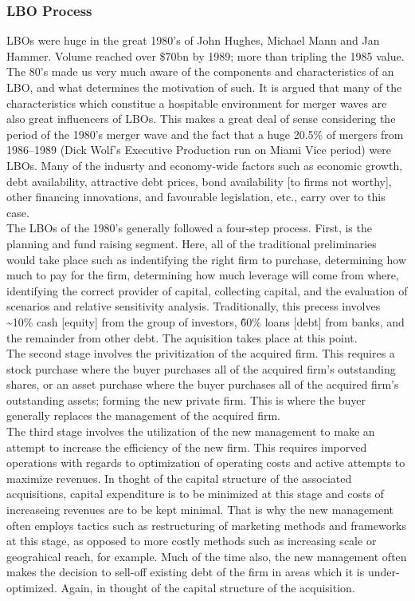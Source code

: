 \documentclass[11pt, english]{article}
\begin{document}
		\subsubsection*{LBO Process}

	LBOs were huge in the great 1980's of John Hughes, Michael Mann and Jan Hammer. Volume reached over \$70bn by 1989; more than tripling the 1985 value. The 80's made us very much aware of the components and characteristics of an LBO, and what determines the motivation of such. It is argued that many of the characteristics which constitue a hospitable environment for merger waves are also great influencers of LBOs. This makes a great deal of sense considering the period of the 1980's merger wave and the fact that a huge 20.5\% of mergers from 1986--1989 (Dick Wolf's Executive Production run on Miami Vice period) were LBOs. Many of the indusrty and economy-wide factors such as economic growth, debt availability, attractive debt prices, bond availability [to firms not worthy], other financing innovations, and favourable legislation, etc., carry over to this case.\\

	The LBOs of the 1980's generally followed a four-step process. First, is the planning and fund raising segment. Here, all of the traditional preliminaries would take place such as indentifying the right firm to purchase, determining how much to pay for the firm, determining how much leverage will come from where, identifying the correct provider of capital, collecting capital, and the evaluation of scenarios and relative sensitivity analysis. Traditionally, this precess involves \~{}10\% cash [equity] from the group of investors, \~{60}\% loans [debt] from banks, and the remainder from other debt. The aquisition takes place at this point.\\

	The second stage involves the privitization of the acquired firm. This requires a stock purchase where the buyer purchases all of the acquired firm's outstanding shares, or an asset purchase where the buyer purchases all of the acquired firm's outstanding assets; forming the new private firm. This is where the buyer generally replaces the management of the acquired firm.\\

	The third stage involves the utilization of the new management to make an attempt to increase the efficiency of the new firm. This requires imporved operations with regards to optimization of operating costs and active attempts to maximize revenues. In thoght of the capital structure of the associated acquisitions, capital expenditure is to be minimized at this stage and costs of increaseing revenues are to be kept minimal. That is why the new management often employs tactics such as restructuring of marketing methods and frameworks at this stage, as opposed to more costly methods such as increasing scale or geograhical reach, for example. Much of the time also, the new management often makes the decision to sell-off existing debt of the firm in areas which it is under-optimized. Again, in thought of the capital structure of the acquisition.\\
\end{document}
